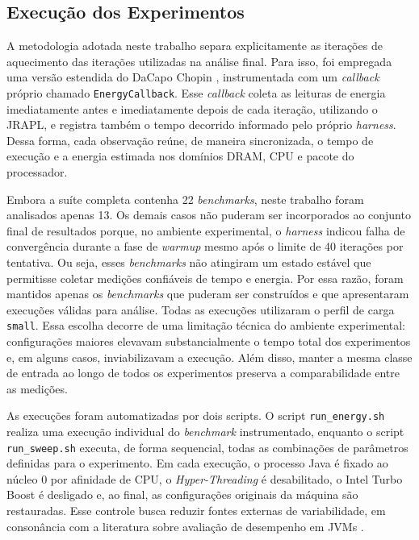 \subsection{Execução dos Experimentos}

A metodologia adotada neste trabalho separa
explicitamente as iterações de aquecimento das iterações utilizadas na análise
final. Para isso, foi empregada uma versão estendida do DaCapo Chopin
\cite{dacapochopin}, instrumentada com um \textit{callback} próprio chamado
\texttt{EnergyCallback}. Esse \textit{callback} coleta as leituras de energia
imediatamente antes e imediatamente depois de cada iteração, utilizando o
JRAPL, e registra também o tempo decorrido informado pelo próprio
\textit{harness}. Dessa forma, cada observação reúne, de maneira sincronizada,
o tempo de execução e a energia estimada nos domínios DRAM, CPU e pacote do
processador.

Embora a suíte completa contenha 22 \textit{benchmarks}, neste trabalho foram
analisados apenas 13. Os demais casos não puderam ser incorporados ao conjunto
final de resultados porque, no ambiente experimental, o
\textit{harness} indicou falha de convergência durante a fase de \textit{warmup}
mesmo após o limite de 40 iterações por tentativa. Ou seja, esses
\textit{benchmarks} não atingiram um estado estável que
permitisse coletar medições confiáveis de tempo e energia. Por essa razão,
foram mantidos apenas os \textit{benchmarks} que puderam ser construídos e que
apresentaram execuções válidas para análise. Todas as execuções utilizaram o
perfil de carga \texttt{small}. Essa escolha decorre de uma limitação técnica do
ambiente experimental: configurações maiores elevavam substancialmente o tempo
total dos experimentos e, em alguns casos, inviabilizavam a execução. Além
disso, manter a mesma classe de entrada ao longo de todos os experimentos
preserva a comparabilidade entre as medições.

As execuções foram automatizadas por dois scripts. O script
\texttt{run\_energy.sh} realiza uma execução individual do \textit{benchmark}
instrumentado, enquanto o script \texttt{run\_sweep.sh} executa, de forma
sequencial, todas as combinações de parâmetros definidas para o experimento. Em
cada execução, o processo Java é fixado ao núcleo 0 por afinidade de CPU, o
\textit{Hyper-Threading} é desabilitado, o Intel Turbo Boost é desligado e, ao
final, as configurações originais da máquina são restauradas. Esse controle
busca reduzir fontes externas de variabilidade, em consonância com a literatura
sobre avaliação de desempenho em JVMs
\cite{vms-hot-and-cold, steady-state-assessment}.

